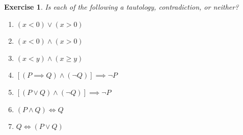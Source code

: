 \documentclass{article}[12pt]
\newtheorem{exercise}{Exercise}[section]
\begin{document}
            \begin{exercise}
                Is each of the following a tautology, contradiction, or neither?
                \begin{multicols}{2}
                    \begin{enumerate}
                        \item
                        $(x < 0) \lor (x > 0)$
                        
                        \item
                        $(x < 0) \land (x > 0)$
                        
                        \item
                        $(x < y) \land (x \ge y)$
                        
                        \item
                        $[(P \implies Q) \land (\neg Q)] \implies  \neg P$
                        
                        \item
                        $[(P \lor Q) \land (\neg Q)] \implies  \neg P$
                        
                        \item
                        $(P \land Q) \iff Q$
                        
                        \item
                        $Q \iff (P \lor Q)$
                        
                    \end{enumerate}
                \end{multicols}
                
            \end{exercise}
            
\end{document}
